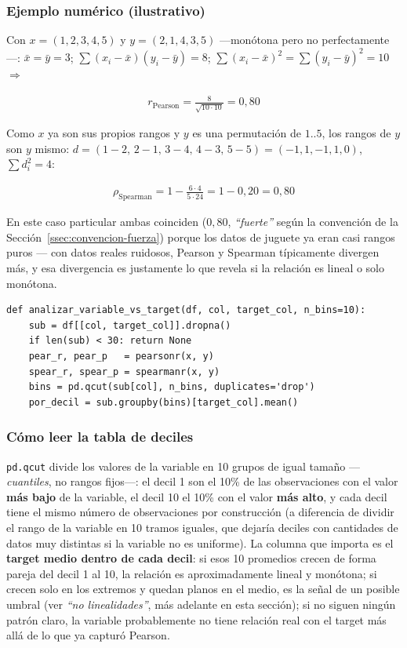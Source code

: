 \documentclass[11pt,a4paper]{article}
\newcommand{\code}[1]{\texttt{\small #1}}
\newcommand{\dq}[1]{\emph{``#1''}}
\begin{document}
\subsubsection*{Ejemplo numérico (ilustrativo)}

Con \(x=(1,2,3,4,5)\) y \(y=(2,1,4,3,5)\) —monótona pero no perfectamente—:
\(\bar{x}=\bar{y}=3\); \(\sum(x_i-\bar{x})(y_i-\bar{y}) = 8\);
\(\sum(x_i-\bar{x})^2 = \sum(y_i-\bar{y})^2 = 10\) \(\Rightarrow\)

\begin{align}
r_{\mathrm{Pearson}} = \frac{8}{\sqrt{10\cdot 10}} = 0{,}80
\end{align}

Como \(x\) ya son sus propios rangos y \(y\) es una permutación de \(1..5\), los rangos de
\(y\) son \(y\) mismo: \(d = (1{-}2,\,2{-}1,\,3{-}4,\,4{-}3,\,5{-}5) = (-1,1,-1,1,0)\),
\(\sum d_i^2 = 4\):

\begin{align}
\rho_{\mathrm{Spearman}} = 1 - \frac{6\cdot 4}{5\cdot 24} = 1 - 0{,}20 = 0{,}80
\end{align}

En este caso particular ambas coinciden (\(0{,}80\), \dq{fuerte} según la convención de la
Sección~\ref{ssec:convencion-fuerza}) porque los datos de juguete ya eran casi rangos puros
— con datos reales ruidosos, Pearson y Spearman típicamente divergen más, y esa divergencia
es justamente lo que revela si la relación es lineal o solo monótona.

\begin{lstlisting}
def analizar_variable_vs_target(df, col, target_col, n_bins=10):
    sub = df[[col, target_col]].dropna()
    if len(sub) < 30: return None
    pear_r, pear_p   = pearsonr(x, y)
    spear_r, spear_p = spearmanr(x, y)
    bins = pd.qcut(sub[col], n_bins, duplicates='drop')
    por_decil = sub.groupby(bins)[target_col].mean()
\end{lstlisting}

\subsubsection*{Cómo leer la tabla de deciles}

\code{pd.qcut} divide los valores de la variable en 10 grupos de igual tamaño
—\emph{cuantiles}, no rangos fijos—: el decil 1 son el 10\% de las observaciones con el
valor \textbf{más bajo} de la variable, el decil 10 el 10\% con el valor \textbf{más
alto}, y cada decil tiene el mismo número de observaciones por construcción (a diferencia
de dividir el rango de la variable en 10 tramos iguales, que dejaría deciles con
cantidades de datos muy distintas si la variable no es uniforme). La columna que importa
es el \textbf{target medio dentro de cada decil}: si esos 10 promedios crecen de forma
pareja del decil 1 al 10, la relación es aproximadamente lineal y monótona; si crecen
solo en los extremos y quedan planos en el medio, es la señal de un posible umbral (ver
\dq{no linealidades}, más adelante en esta sección); si no siguen ningún patrón claro, la
variable probablemente no tiene relación real con el target más allá de lo que ya
capturó Pearson.
\end{document}
